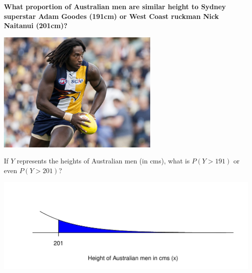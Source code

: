 \documentclass[t,xcolor=pdftex,dvipsnames,table]{beamer}
\makeatletter
\def\maxwidth{ %
  \ifdim\Gin@nat@width>\linewidth
    \linewidth
  \else
    \Gin@nat@width
  \fi
}
\newenvironment{knitrout}{}{} %
\makeatother
\begin{document}
\begin{frame}{}

{\bf What proportion of Australian men are similar height to Sydney superstar Adam Goodes (191cm) or West Coast ruckman Nick Naitanui (201cm)?}

\begin{center}
\includegraphics[height=6cm]{../images/NicN.jpg}
\end{center}

\href{http://www.sbs.com.au/news/sites/sbs.com.au.news/files/images/1/5/15Apr_NicNaitanui_800x600.jpg}{}
\end{frame}


\begin{frame}{}

If $Y$ represents the heights of Australian men (in cms), what is $P(Y > 191)$ or even $P(Y > 201)$?

\vspace{1cm}
\begin{knitrout}
\color{fgcolor}
\includegraphics[width=\maxwidth]{figure/unnamed-chunk-3-1} 

\end{knitrout}
\end{frame}
\end{document}
